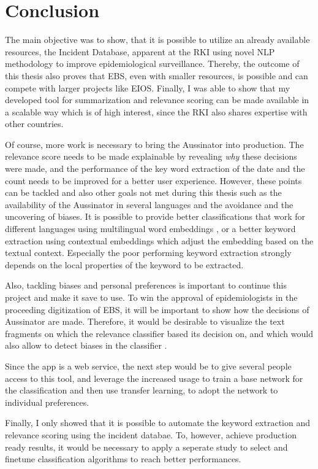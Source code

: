 \chapter{Conclusion}
  The main objective was to show, that it is possible to utilize an already available resources, the Incident Database, apparent at the RKI using novel NLP methodology to improve epidemiological surveillance.
  Thereby, the outcome of this thesis also proves that EBS, even with smaller resources, is possible and can compete with larger projects like EIOS.
  Finally, I was able to show that my developed tool for summarization and relevance scoring can be made available in a scalable way which is of high interest, since the RKI also shares expertise with other countries.

  Of course, more work is necessary to bring the Aussinator into production.
  The relevance score needs to be made explainable by revealing \emph{why} these decisions were made, and the performance of the key word extraction of the date and the count needs to be improved for a better user experience.
  However, these points can be tackled and also other goals not met during this thesis such as the availability of the Aussinator in several languages and the avoidance and the uncovering of biases.
  It is possible to provide better classifications that work for different languages using multilingual word embeddings \citep{Chen2018}, or a better keyword extraction using contextual embeddings \citep{Devlin2018, Peters2018} which adjust the embedding based on the textual context.
  Especially the poor performing keyword extraction strongly depends on the local properties of the keyword to be extracted.

  Also, tackling biases and personal preferences is important to continue this project and make it save to use.
  To win the approval of epidemiologists in the proceeding digitization of EBS, it will be important to show how the decisions of Aussinator are made.
  Therefore, it would be desirable to visualize the text fragments on which the relevance classifier based its decision on, and which would also allow to detect biases in the classifier \citep{Arras2017}.

  Since the app is a web service, the next step would be to give several people access to this tool, and leverage the increased usage to train a base network for the classification and then use transfer learning, to adopt the network to individual preferences.

  Finally, I only showed that it is possible to automate the keyword extraction and relevance scoring using the incident databae.
  To, however, achieve production ready results, it would be necessary to apply a seperate study to select and finetune classification algorithms to reach better performances.
